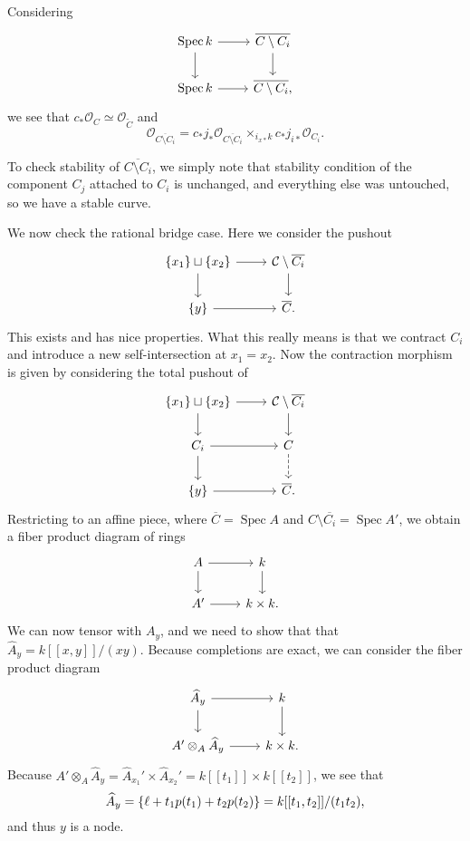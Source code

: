 \documentclass[leqno, openany]{memoir}
\theoremstyle{definition}
\theoremstyle{remark}
\theoremstyle{plain}
\theoremstyle{definition}
\theoremstyle{remark}
\newcommand{\mc}[1]{\mathcal{#1}}
\newcommand{\ol}[1]{\overline{#1}}
\newcommand{\wt}[1]{\widetilde{#1}}
\newcommand{\wh}[1]{\widehat{#1}}
\DeclareMathOperator{\Spec}{Spec}
\begin{document}
Considering
\begin{equation*}
\begin{tikzcd}
    \Spec k \ar{r} \ar{d} & \ol{C \setminus C_i} \ar{d} \\
    \Spec k \ar{r} & \ol{C \setminus C_i},
\end{tikzcd}
\end{equation*}
we see that $c_* \mc{O}_C \simeq \mc{O}_{\wt{C}}$ and
\[ \mc{O}_{\ol{C \setminus C_i}} = c_* j_* \mc{O}_{\ol{C \setminus C_i}} \times_{i_{x*} k} c_* j_{i*} \mc{O}_{C_i}. \]

To check stability of $\ol{C \setminus C_i}$, we simply note that stability condition of the component $C_j$ attached to $C_i$ is unchanged, and everything else was untouched, so we have a stable curve.

We now check the rational bridge case. Here we consider the pushout
\begin{equation*}
\begin{tikzcd}
    \qty{x_1} \sqcup \qty{x_2} \ar{d}\ar{r} & \mc{C} \setminus \ol{C_i} \ar{d} \\
    \qty{y}\ar{r} & \ol{C}.
\end{tikzcd}
\end{equation*}
This exists and has nice properties. What this really means is that we contract $C_i$ and introduce a new self-intersection at $x_1 = x_2$. Now the contraction morphism is given by considering the total pushout of
\begin{equation*}
\begin{tikzcd}
    \qty{x_1} \sqcup \qty{x_2} \ar{d}\ar{r} & \mc{C} \setminus \ol{C_i} \ar{d} \\
    C_i \ar{r} \ar{d} & C \ar[dashrightarrow]{d} \\
    \qty{y}\ar{r} & \ol{C}.
\end{tikzcd}
\end{equation*}
Restricting to an affine piece, where $\ol{C} = \Spec A$ and $C \setminus \ol{C_i} = \Spec A'$, we obtain a fiber product diagram of rings
\begin{equation*}
\begin{tikzcd}
    A \ar{r} \ar{d} & k \ar{d} \\
    A' \ar{r} & k \times k.
\end{tikzcd}
\end{equation*}
We can now tensor with $A_y$, and we need to show that that $\wh{A}_y = k[[x,y]]/(xy)$. Because completions are exact, we can consider the fiber product diagram
\begin{equation*}
\begin{tikzcd}
    \wh{A}_y \ar{r} \ar{d} & k \ar{d} \\
    A' \otimes_A \wh{A}_y \ar{r} & k \times k.
\end{tikzcd}
\end{equation*}
Because $A' \otimes_A \wh{A}_y = \wh{A}_{x_1}' \times \wh{A}_{x_2}' = k[[t_1]] \times k[[t_2]]$, we see that
\[ \wh{A}_y = \qty{\ell + t_1 p(t_1) + t_2 p(t_2)} = k[[t_1, t_2]] / (t_1t_2), \]
and thus $y$ is a node.
\end{document}
